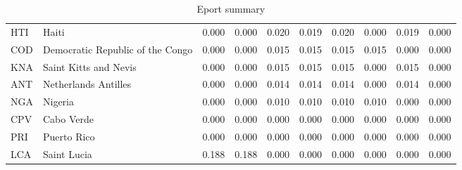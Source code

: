 \begin{table}[ht]
\begin{tabular}{llrrrrrrrr}
  HTI & Haiti & 0.000 & 0.000 & 0.020 & 0.019 & 0.020 & 0.000 & 0.019 & 0.000 \\ 
  COD & Democratic Republic of the Congo & 0.000 & 0.000 & 0.015 & 0.015 & 0.015 & 0.015 & 0.000 & 0.000 \\ 
  KNA & Saint Kitts and Nevis & 0.000 & 0.000 & 0.015 & 0.015 & 0.015 & 0.000 & 0.015 & 0.000 \\ 
  ANT & Netherlands Antilles & 0.000 & 0.000 & 0.014 & 0.014 & 0.014 & 0.000 & 0.014 & 0.000 \\ 
  NGA & Nigeria & 0.000 & 0.000 & 0.010 & 0.010 & 0.010 & 0.010 & 0.000 & 0.000 \\ 
  CPV & Cabo Verde & 0.000 & 0.000 & 0.000 & 0.000 & 0.000 & 0.000 & 0.000 & 0.000 \\ 
  PRI & Puerto Rico & 0.000 & 0.000 & 0.000 & 0.000 & 0.000 & 0.000 & 0.000 & 0.000 \\ 
  LCA & Saint Lucia & 0.188 & 0.188 & 0.000 & 0.000 & 0.000 & 0.000 & 0.000 & 0.000 \\ 
   \hline
\end{tabular}
\caption{Eport summary} 
\end{table}

